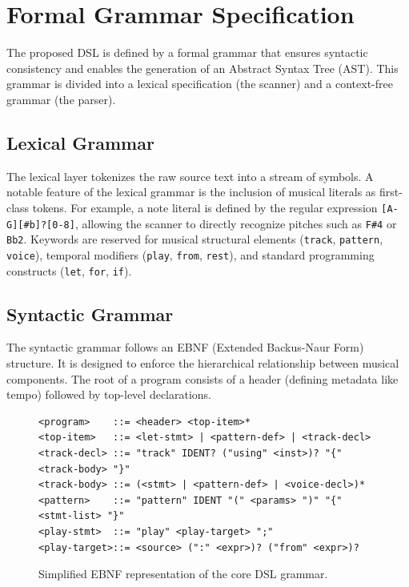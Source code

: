 \section{Formal Grammar Specification}\label{sec:formal-grammar}

The proposed DSL is defined by a formal grammar that ensures syntactic consistency and enables the generation of an
Abstract Syntax Tree (AST).
This grammar is divided into a lexical specification (the scanner) and a context-free grammar (the parser).

\subsection{Lexical Grammar}\label{subsec:lexical-grammar}

The lexical layer tokenizes the raw source text into a stream of symbols.
A notable feature of the lexical grammar is the inclusion of musical literals as first-class tokens.
For example, a note literal is defined by the regular expression \verb|[A-G][#b]?[0-8]|, allowing the scanner to
directly recognize pitches such as \texttt{F\#4} or \texttt{Bb2}.
Keywords are reserved for musical structural elements (\texttt{track}, \texttt{pattern}, \texttt{voice}), temporal
modifiers (\texttt{play}, \texttt{from}, \texttt{rest}), and standard programming constructs (\texttt{let},
\texttt{for}, \texttt{if}).

\subsection{Syntactic Grammar}\label{subsec:syntactic-grammar}

The syntactic grammar follows an EBNF (Extended Backus-Naur Form) structure.
It is designed to enforce the hierarchical relationship between musical components.
The root of a program consists of a header (defining metadata like tempo) followed by top-level declarations.

\begin{figure}[htbp]
  \centering
  \begin{small}
    \begin{verbatim}
<program>    ::= <header> <top-item>*
<top-item>   ::= <let-stmt> | <pattern-def> | <track-decl>
<track-decl> ::= "track" IDENT? ("using" <inst>)? "{" <track-body> "}"
<track-body> ::= (<stmt> | <pattern-def> | <voice-decl>)*
<pattern>    ::= "pattern" IDENT "(" <params> ")" "{" <stmt-list> "}"
<play-stmt>  ::= "play" <play-target> ";"
<play-target>::= <source> (":" <expr>)? ("from" <expr>)?
    \end{verbatim}
  \end{small}
  \caption{Simplified EBNF representation of the core DSL grammar.}\label{fig:figure}
\end{figure}

